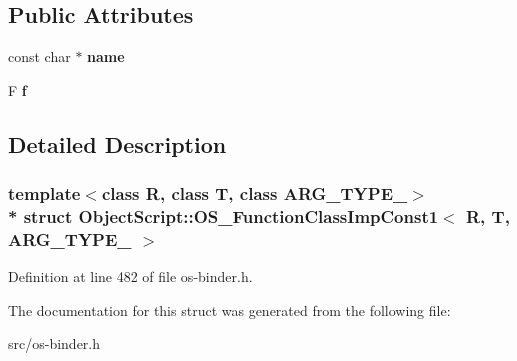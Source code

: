 \subsection*{Public Attributes}
\begin{DoxyCompactItemize}
\item 
const char $\ast$ {\bfseries name}\hypertarget{struct_object_script_1_1_o_s___function_class_imp_const1_aaeedb8890ce72e5e34dea2d9e5434cdc}{}\label{struct_object_script_1_1_o_s___function_class_imp_const1_aaeedb8890ce72e5e34dea2d9e5434cdc}

\item 
F {\bfseries f}\hypertarget{struct_object_script_1_1_o_s___function_class_imp_const1_a5061ee02d46103a5297ed465651c3f45}{}\label{struct_object_script_1_1_o_s___function_class_imp_const1_a5061ee02d46103a5297ed465651c3f45}

\end{DoxyCompactItemize}


\subsection{Detailed Description}
\subsubsection*{template$<$class R, class T, class A\+R\+G\+\_\+\+T\+Y\+P\+E\+\_$>$\\*
struct Object\+Script\+::\+O\+S\+\_\+\+Function\+Class\+Imp\+Const1$<$ R, T, A\+R\+G\+\_\+\+T\+Y\+P\+E\+\_ $>$}



Definition at line 482 of file os-\/binder.\+h.



The documentation for this struct was generated from the following file\+:\begin{DoxyCompactItemize}
\item 
src/os-\/binder.\+h\end{DoxyCompactItemize}
